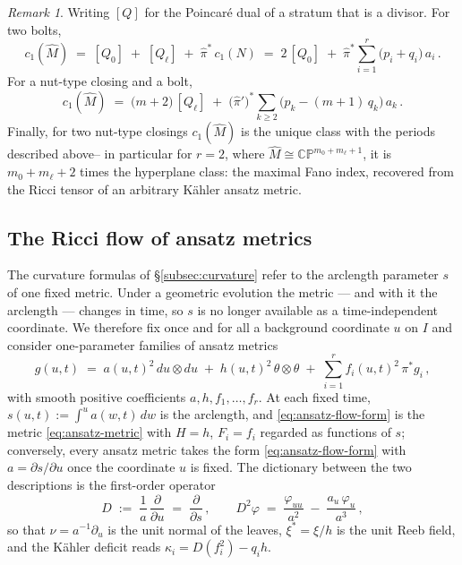\documentclass[11pt]{amsart}
\theoremstyle{plain}
\numberwithin{equation}{section}
\theoremstyle{definition}
\theoremstyle{remark}
\newtheorem*{remarkx}{Remark}
\begin{document}
	\begin{remarkx} Writing $[Q]$ for the Poincaré dual of a stratum that is a divisor. For {two bolts},
	\[
	c_1(\widehat{M}) \;=\; [Q_0] \;+\; [Q_\ell] \;+\; \widehat{\pi}^*\, c_1(N) \;=\; 2\, [Q_0] \;+\; \widehat{\pi}^* \sum_{i=1}^r \big( p_i + q_i \big)\, a_i \,.
	\]
	For {a nut-type closing and a bolt},
	\[
	c_1(\widehat{M}) \;=\; \big( m + 2 \big)\, [Q_\ell] \;+\; \big( \widehat{\pi}' \big)^* \sum_{k \geq 2} \big( p_k - ( m + 1 )\, q_k \big)\, a_k \,.
	\]
	Finally, for {two nut-type closings} $c_1(\widehat{M})$ is the unique class with the periods described above-- in particular for $r = 2$, where $\widehat{M} \cong \mathbb{CP}^{m_0 + m_\ell + 1}$, it is $m_0 + m_\ell + 2$ times the hyperplane class: the maximal Fano index, recovered from the Ricci tensor of an arbitrary Kähler ansatz metric.
\end{remarkx}

\subsection{The Ricci flow of ansatz metrics}\label{subsec:ricci-flow-ansatz}
The curvature formulas of \S\ref{subsec:curvature} refer to the arclength parameter $s$ of one fixed metric. Under a geometric evolution the metric --- and with it the arclength --- changes in time, so $s$ is no longer available as a time-independent coordinate. We therefore fix once and for all a background coordinate $u$ on $I$ and consider one-parameter families of ansatz metrics
\begin{equation}\label{eq:ansatz-flow-form}
	g(u, t) \;=\; a(u,t)^2\, du \otimes du \;+\; h(u,t)^2\, \theta \otimes \theta \;+\; \sum_{i=1}^r f_i(u,t)^2\, \pi^* g_i \,,
\end{equation}
with smooth positive coefficients $a, h, f_1, \dots, f_r$. At each fixed time, $s(u,t) := \int^u a(w,t)\, dw$ is the arclength, and \eqref{eq:ansatz-flow-form} is the metric \eqref{eq:ansatz-metric} with $H = h$, $F_i = f_i$ regarded as functions of $s$; conversely, every ansatz metric takes the form \eqref{eq:ansatz-flow-form} with $a = \partial s / \partial u$ once the coordinate $u$ is fixed. The dictionary between the two descriptions is the first-order operator
\[
D \;:=\; \frac{1}{a}\, \frac{\partial}{\partial u} \;=\; \frac{\partial}{\partial s} \,, \qquad D^2 \varphi \;=\; \frac{\varphi_{uu}}{a^2} \;-\; \frac{a_u\, \varphi_u}{a^3} \,,
\]
so that $\nu = a^{-1} \partial_u$ is the unit normal of the leaves, $\xi^* = \xi/h$ is the unit Reeb field, and the Kähler deficit reads $\kappa_i = D(f_i^2) - q_i h$. %
\end{document}
